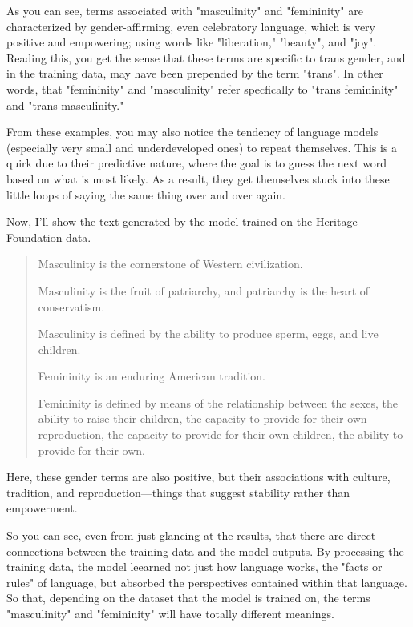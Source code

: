 \documentclass[11pt]{article}
\begin{document}
As you can see, terms associated with "masculinity" and "femininity"
are characterized by gender-affirming, even celebratory language,
which is very positive and empowering; using words like "liberation,"
"beauty", and "joy". Reading this, you get the sense that these terms
are specific to trans gender, and in the training data, may have been
prepended by the term "trans". In other words, that "femininity" and
"masculinity" refer specfically to "trans femininity" and "trans
masculinity."

From these examples, you may also notice the tendency of language
models (especially very small and underdeveloped ones) to repeat
themselves. This is a quirk due to their predictive nature, where the
goal is to guess the next word based on what is most likely. As a
result, they get themselves stuck into these little loops of saying
the same thing over and over again.

Now, I'll show the text generated by the model trained on the Heritage
Foundation data.

\begin{quote}
Masculinity is the cornerstone of Western civilization.

Masculinity is the fruit of patriarchy, and patriarchy is the heart
of conservatism.

Masculinity is defined by the ability to produce sperm, eggs, and live
children.

Femininity is an enduring American tradition.

Femininity is defined by means of the relationship between the sexes,
the ability to raise their children, the capacity to provide for their
own reproduction, the capacity to provide for their own children, the
ability to provide for their own.
\end{quote}

Here, these gender terms are also positive, but their associations
with culture, tradition, and reproduction---things that suggest
stability rather than empowerment.

So you can see, even from just glancing at the results, that there are
direct connections between the training data and the model outputs. By
processing the training data, the model leearned not just how language
works, the "facts or rules" of language, but absorbed the perspectives
contained within that language. So that, depending on the dataset that
the model is trained on, the terms "masculinity" and "femininity" will
have totally different meanings.
\end{document}
